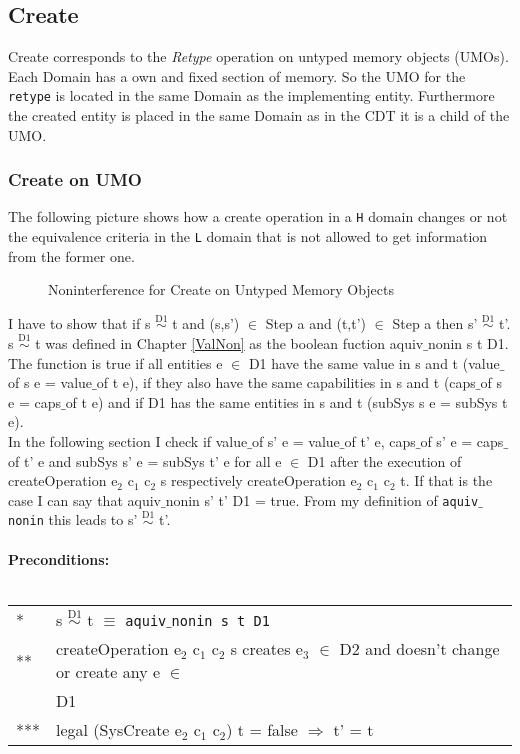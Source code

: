 \subsection{Create}\label{sec:Create}
Create corresponds to the \textit{Retype} operation on untyped memory objects (UMOs). Each Domain has a own and fixed section of memory. So the UMO for the \texttt{retype} is located in the same Domain as the implementing entity. Furthermore the created entity is placed in the same Domain as in the CDT it is a child of the UMO.  
\subsubsection{Create on UMO}
The following picture shows how a create operation in a \texttt{H} domain changes or not the equivalence criteria in the \texttt{L} domain that is not allowed to get information from the former one. \\
\begin{flushleft}
\begin{figure}[H]
\caption{Noninterference for Create on Untyped Memory Objects}
\end{figure}
\end{flushleft}
I have to show that if s $\overset{\text{D1}}{\sim}$ t and (s,s') $\in$ Step a and (t,t') $\in$ Step a then s' $\overset{\text{D1}}{\sim}$ t'. 
s $\overset{\text{D1}}{\sim}$ t was defined in Chapter \ref{ValNon} as the boolean fuction aquiv$\_$nonin s t D1. The function is true if all entities e $\in$ D1 have the same value in s and t (value$\_$of s e = value$\_$of t e), if they also have the same capabilities in s and t (caps$\_$of s e = caps$\_$of t e) and if D1 has the same entities in s and t (subSys s e = subSys t e).\\
In the following section I check if value$\_$of s' e = value$\_$of t' e, caps$\_$of s' e = caps$\_$of t’ e and subSys s' e = subSys t' e for all e $\in$ D1 after the execution of 
createOperation e$_2$ c$_1$ c$_2$ s respectively createOperation e$_2$ c$_1$ c$_2$ t. If that is the case I can say that aquiv$\_$nonin s' t' D1 = true. From my definition of \texttt{aquiv$\_$nonin} this leads to s' $\overset{\text{D1}}{\sim}$ t'. \\ \\
\textbf{Preconditions:} \\ \\
\begin{tabular}{ll}
* & s $\overset{\text{D1}}{\sim}$ t $\equiv$ \texttt{aquiv$\_$nonin s t D1}	\\ 
** & createOperation e$_2$ c$_1$ c$_2$ s creates e$_3$ $\in$ D2 and doesn't change or create any e $\in$ \\
&  D1 \\
*** & legal (SysCreate e$_2$ c$_1$ c$_2$) t = false $\Rightarrow$ t' = t
\end{tabular}\\ \\ \\
